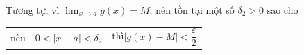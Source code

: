 \begin{minipage}[t][\textheight][t]{120mm}
    Tương tự, vì $\displaystyle\lim_{x \to a} g(x) = M$, nên tồn tại một số $\delta_2 > 0$ sao cho
    \begin{center}
    \renewcommand{\arraystretch}{1.2}
    \begin{tabular}{l@{\qquad}l@{\qquad}l}
    nếu & $0 < |x - a| < \delta_2$ & thì\qquad $|g(x) - M| < \dfrac{\varepsilon}{2}$
    \end{tabular}
    \end{center}
\end{minipage}
